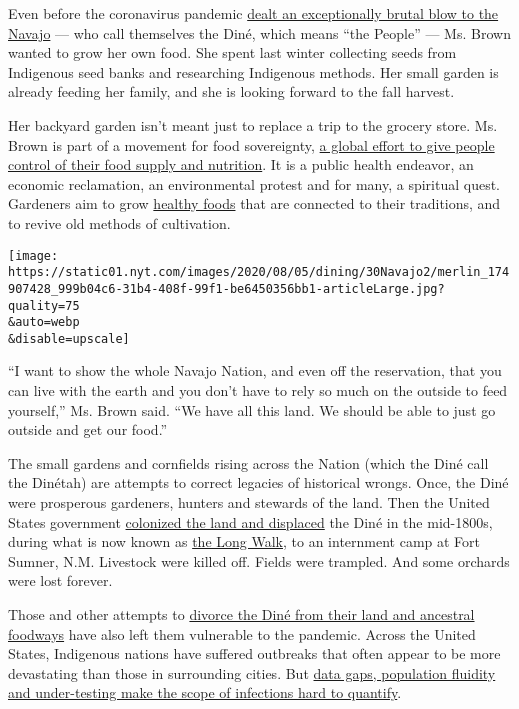 Even before the coronavirus pandemic
\href{https://www.nytimes.com/2020/05/11/us/coronavirus-native-americans-indian-country.html}{dealt
an exceptionally brutal blow to the Navajo} --- who call themselves the
Diné, which means ``the People'' --- Ms. Brown wanted to grow her own
food. She spent last winter collecting seeds from Indigenous seed banks
and researching Indigenous methods. Her small garden is already feeding
her family, and she is looking forward to the fall harvest.

Her backyard garden isn't meant just to replace a trip to the grocery
store. Ms. Brown is part of a movement for food sovereignty,
\href{https://foodsecurecanada.org/who-we-are/what-food-sovereignty}{a
global effort to give people control of their food supply and
nutrition}. It is a public health endeavor, an economic reclamation, an
environmental protest and for many, a spiritual quest. Gardeners aim to
grow
\href{https://www.nytimes.com/2020/04/13/dining/native-americans-coronavirus.html}{healthy
foods} that are connected to their traditions, and to revive old methods
of cultivation.

\texttt{[image: https://static01.nyt.com/images/2020/08/05/dining/30Navajo2/merlin\_174907428\_999b04c6-31b4-408f-99f1-be6450356bb1-articleLarge.jpg?quality=75\\\&auto=webp\\\&disable=upscale]}

``I want to show the whole Navajo Nation, and even off the reservation,
that you can live with the earth and you don't have to rely so much on
the outside to feed yourself,'' Ms. Brown said. ``We have all this land.
We should be able to just go outside and get our food.''

The small gardens and cornfields rising across the Nation (which the
Diné call the Dinétah) are attempts to correct legacies of historical
wrongs. Once, the Diné were prosperous gardeners, hunters and stewards
of the land. Then the United States government
\href{https://www.nytimes.com/2020/05/13/opinion/sunday/navajo-nation-coronavirus.html}{colonized
the land and displaced} the Diné in the mid-1800s, during what is now
known as
\href{https://americanindian.si.edu/nk360/navajo/long-walk/long-walk.cshtml}{the
Long Walk}, to an internment camp at Fort Sumner, N.M. Livestock were
killed off. Fields were trampled. And some orchards were lost forever.

Those and other attempts to
\href{https://www.firstnations.org/wp-content/uploads/publication-attachments/Dine_Policy_Institute_Food_Sovereignty_Report.pdf}{divorce
the Diné from their land and ancestral foodways} have also left them
vulnerable to the pandemic. Across the United States, Indigenous nations
have suffered outbreaks that often appear to be more devastating than
those in surrounding cities. But
\href{https://www.nytimes.com/2020/07/30/us/native-americans-coronavirus-data.html}{data
gaps, population fluidity and under-testing make the scope of infections
hard to quantify}.

